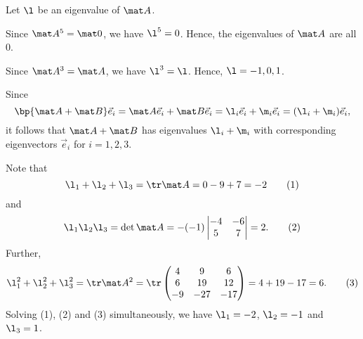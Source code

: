 \begin{solution}
    \begin{ppart}
        Let $\l$ be an eigenvalue of $\mat A$.

        \begin{psubpart}
            Since $\mat A^5 = \mat 0$, we have $\l^5 = 0$. Hence, the eigenvalues of $\mat A$ are all 0.
        \end{psubpart}
        \begin{psubpart}
            Since $\mat A^3 = \mat A$, we have $\l^3 = \l$. Hence, $\l = -1, 0, 1$.
        \end{psubpart}
    \end{ppart}
    \begin{ppart}
        \begin{psubpart}
            Since \[\bp{\mat A + \mat B} \vec e_i = \mat A \vec e_i + \mat B \vec e_i = \l_i \vec e_i + \m_i \vec e_i = (\l_i + \m_i) \vec e_i,\] it follows that $\mat A + \mat B$ has eigenvalues $\l_i + \m_i$ with corresponding eigenvectors $\vec e_i$ for $i = 1, 2, 3$.
        \end{psubpart}
        \begin{psubpart}
            Note that \[\l_1 + \l_2 + \l_3 = \tr \mat A = 0 - 9 + 7 = -2 \tag{1}\] and \[\l_1 \l_2 \l_3 = \det \mat A = -(-1) \begin{vmatrix}-4 & -6 \\ 5 & 7\end{vmatrix} = 2. \tag{2}\] Further, \[\l_1^2 + \l_2^2 + \l_3^2 = \tr \mat A^2 = \tr \begin{pmatrix}4 & 9 & 6 \\ 6 & 19 & 12 \\ -9 & -27 & -17\end{pmatrix} = 4 + 19 - 17 = 6. \tag{3}\] Solving (1), (2) and (3) simultaneously, we have $\l_1 = -2$, $\l_2 = -1$ and $\l_3 = 1$.


\end{psubpart}
\end{ppart}
\end{solution}
